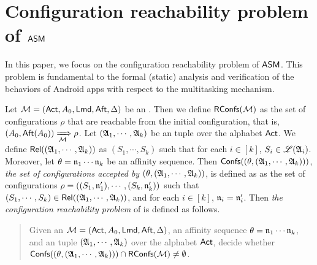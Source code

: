 




\section{Configuration reachability problem of $\textsf{ASM}$}

In this paper, we focus on the configuration reachability problem of $\textsf{ASM}$. This problem is fundamental to the formal (static) analysis and verification of the behaviors of Android apps with respect to the multitasking mechanism.  

Let ${\mathcal{M} } =({\sf Act}, A_0, {\sf Lmd}, {\sf Aft}, \Delta)$ be an  {\AMASS}. Then we define $\mathsf{RConfs}({\mathcal{M} })$ as the set of configurations $\rho$ that are reachable from the initial configuration, that is, 
$(A_0, {\sf Aft}(A_0)) \xRightarrow[{\mathcal{M} }]{} \rho$. 
Let $({\mathfrak{A} }_1,\cdots,{\mathfrak{A} }_k)$ be an {\NFA} tuple over the alphabet ${\sf Act}$. We define $\mathsf{Rel}(({\mathfrak{A} }_1, \cdots, {\mathfrak{A} }_k))$ as $(S_1, \cdots, S_k)$ such that for each $i \in [k]$, $S_i \in {\mathscr{L} }({\mathfrak{A} }_i)$. Moreover, let $\theta = \mathfrak{n}_1\cdots\mathfrak{n}_k$ be an affinity sequence. Then ${\mathsf{Confs} }((\theta, ({\mathfrak{A} }_1,\cdots,{\mathfrak{A} }_k)))$, \emph{the set of configurations accepted by $(\theta, ({\mathfrak{A} }_1,\cdots,{\mathfrak{A} }_k))$}, is defined as as the set of configurations $\rho = ((S_1,\mathfrak{n}'_1),\cdots,(S_k,\mathfrak{n}'_k))$  such that $(S_1, \cdots, S_k) \in \mathsf{Rel}(({\mathfrak{A} }_1, \cdots, {\mathfrak{A} }_k))$, and for each $i \in [k]$, $\mathfrak{n}_i=\mathfrak{n}_i'$.
%
Then \emph{the configuration reachability problem} of {\AMASS} is defined as follows. 
\begin{quote}
Given an {\AMASS} ${\mathcal{M} }= ({\sf Act}, A_0, {\sf Lmd}, {\sf Aft}, \Delta)$, an affinity sequence $\theta = \mathfrak{n}_1\cdots\mathfrak{n}_k$, and an {\NFA} tuple $({\mathfrak{A} }_1,\cdots,{\mathfrak{A} }_k)$ over the alphabet ${\sf Act}$, decide whether $ {\mathsf{Confs} }({(\theta, ({\mathfrak{A} }_1,\cdots,{\mathfrak{A} }_k))}) \cap \mathsf{RConfs}({\mathcal{M} }) \neq \emptyset$.
\end{quote}

